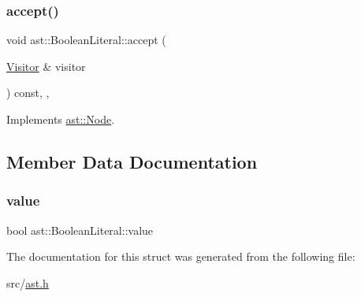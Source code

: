 \subsubsection{\texorpdfstring{accept()}{accept()}}
{\footnotesize\ttfamily void ast\+::\+Boolean\+Literal\+::accept (\begin{DoxyParamCaption}\item[{\hyperlink{structast_1_1_visitor}{Visitor} \&}]{visitor }\end{DoxyParamCaption}) const\hspace{0.3cm}{\ttfamily [inline]}, {\ttfamily [override]}, {\ttfamily [virtual]}}



Implements \hyperlink{structast_1_1_node_abc089ee6caaf06a4445ebdd8391fdebc}{ast\+::\+Node}.



\subsection{Member Data Documentation}
\mbox{\label{structast_1_1_boolean_literal_a439b71339c83768f2bc892f5af84c540}} 
\subsubsection{\texorpdfstring{value}{value}}
{\footnotesize\ttfamily bool ast\+::\+Boolean\+Literal\+::value}



The documentation for this struct was generated from the following file\+:\begin{DoxyCompactItemize}
\item 
src/\hyperlink{ast_8h}{ast.\+h}\end{DoxyCompactItemize}
